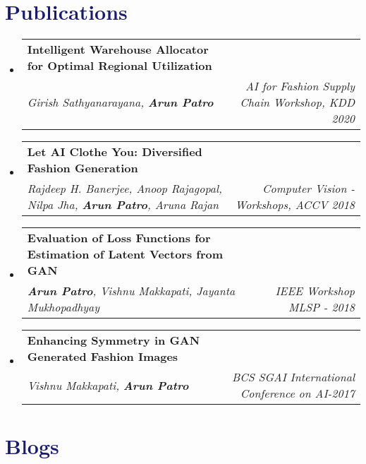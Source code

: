 \documentclass[letterpaper,10.7pt]{article}
\makeatletter
\newcommand{\resumeItem}[1]{
  \item\small{
    {#1 \vspace{-2pt}}
  }
}
\newcommand{\resumeSubheading}[4]{
  \vspace{-2pt}\item
    \begin{tabular*}{1.0\textwidth}[t]{l@{\extracolsep{\fill}}r}
      \textbf{#1} & \small #2 \\
      \textit{\small#3} & \textit{\small #4} \\
    \end{tabular*}\vspace{-7pt}
}
\newcommand{\resumeSubHeadingListStart}{\begin{itemize}[leftmargin=0.0in, label={}]}
\newcommand{\resumeSubHeadingListEnd}{\end{itemize}}
\newcommand{\resumeItemListStart}{\begin{itemize}}
\newcommand{\resumeItemListEnd}{\end{itemize}\vspace{-5pt}}
\makeatother
\begin{document}
\section{\textcolor{MidnightBlue}{Publications}}
\resumeSubHeadingListStart


\resumeSubheading
{Intelligent Warehouse Allocator for Optimal Regional Utilization \href{https://arxiv.org/abs/2007.05081}{\color{blue}{[arxiv]}}}{}
{Girish Sathyanarayana, \textbf{Arun Patro}}{AI for Fashion Supply Chain Workshop, KDD 2020}

\resumeSubheading
{Let AI Clothe You: Diversified Fashion Generation \href{https://doi.org/10.1007/978-3-030-21074-8_7}{\color{blue}{[link]}}}{}
{Rajdeep H. Banerjee, Anoop Rajagopal, Nilpa Jha, \textbf{Arun Patro}, Aruna Rajan}{Computer Vision - Workshops, ACCV 2018}

\resumeSubheading
{Evaluation of Loss Functions for Estimation of Latent Vectors from GAN \href{https://ieeexplore.ieee.org/abstract/document/8517097}{\color{blue}{[link]}}}{}
{\textbf{Arun Patro}, Vishnu Makkapati, Jayanta Mukhopadhyay}{IEEE Workshop MLSP - 2018}

\resumeSubheading
{Enhancing Symmetry in GAN Generated Fashion Images \href{https://doi.org/10.1007/978-3-319-71078-5_34}{\color{blue}{[link]}}}{}
{Vishnu Makkapati, \textbf{Arun Patro}}{BCS SGAI International Conference on AI-2017}

\resumeSubHeadingListEnd

\section{\textcolor{MidnightBlue}{Blogs}}
\end{document}
